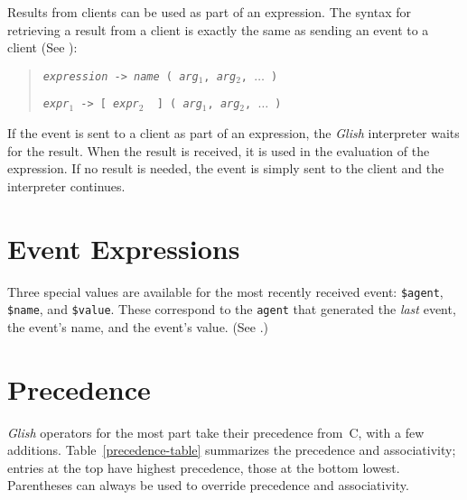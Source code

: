 Results from clients can be used as part of an expression. The syntax for
retrieving a result from a client is exactly the same as sending an event
to a client (See ):
\begin{quote}
    {\tt {\em expression} -> {\em name} ( {\em arg$_1$}, {\em arg$_2$}, $\ldots$ )}

    {\tt {\em expr$_1$} -> [ {\em expr$_2$ } ] ( {\em arg$_1$}, {\em arg$_2$}, $\ldots$ )}
\end{quote}
If the event is sent to a client as part of an expression, 
the {\em Glish} 
interpreter waits for the result. When the result is received, 
it is used in the evaluation of
the expression. If no result is needed, the event is simply sent to the client and
the interpreter continues.

\section{Event Expressions}

Three special values are available for the most recently received event:
{\tt \$agent},
{\tt \$name},
and {\tt \$value}.
These correspond to the {\tt agent} that generated the {\em last} event, the event's
name, and the event's value.  (See .)

\section{Precedence}
\label{precedence}

{\em Glish} operators for the most part take their precedence from~C,
with a few additions.  Table~\ref{precedence-table} summarizes the
precedence and associativity; entries at the top have highest precedence,
those at the bottom lowest.  Parentheses can always be used to override
precedence and associativity.

